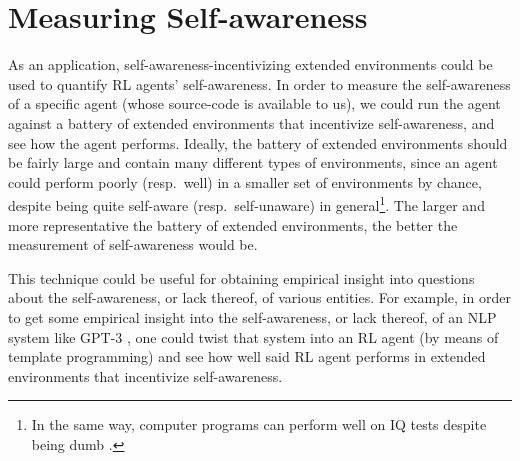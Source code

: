 \documentclass[runningheads]{llncs}
\begin{document}

\section{Measuring Self-awareness}

As an application, self-awareness-incentivizing extended environments could be used
to quantify
RL agents' self-awareness.
In order to measure the self-awareness of a specific agent (whose source-code
is available to us), we could run the agent against a battery
of extended environments that incentivize self-awareness, and see how the agent performs.
Ideally, the battery of extended environments should be fairly large and contain many
different types of environments, since an agent could perform poorly (resp.\ well)
in a smaller set of environments by chance, despite being quite
self-aware (resp.\ self-unaware) in general\footnote{In the same way, computer programs can
perform well on IQ tests despite being dumb \cite{sanghi2003computer}.}.
The larger and more representative the battery of extended environments, the better
the measurement of self-awareness would be.

This technique could be useful for obtaining
empirical insight into questions about the self-awareness, or lack thereof, of
various entities. For example, in order to get some empirical insight into the
self-awareness, or lack thereof, of an NLP system like GPT-3
\cite{chalmers}, one could twist that system into an RL agent (by means of template
programming) and see how well said RL agent performs in extended environments that
incentivize self-awareness.
\end{document}
